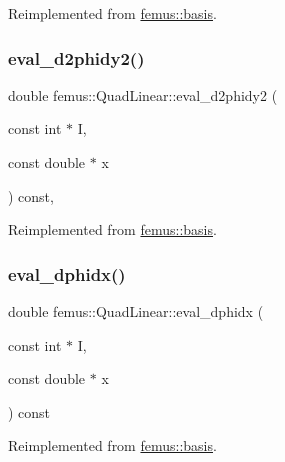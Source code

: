 Reimplemented from \mbox{\hyperlink{classfemus_1_1basis_ac9feaf9e60421143db2a3708f3c7fa48}{femus\+::basis}}.

\mbox{\label{classfemus_1_1_quad_linear_acd036b93e46b4c610a08a71d0ed06745}} 
\subsubsection{\texorpdfstring{eval\+\_\+d2phidy2()}{eval\_d2phidy2()}}
{\footnotesize\ttfamily double femus\+::\+Quad\+Linear\+::eval\+\_\+d2phidy2 (\begin{DoxyParamCaption}\item[{const int $\ast$}]{I,  }\item[{const double $\ast$}]{x }\end{DoxyParamCaption}) const\hspace{0.3cm}{\ttfamily [inline]}, {\ttfamily [virtual]}}



Reimplemented from \mbox{\hyperlink{classfemus_1_1basis_a0febb29fe4b32213ff8d6d428f7241cd}{femus\+::basis}}.

\mbox{\label{classfemus_1_1_quad_linear_a8f5b2825197015a09664548848ceb0bf}} 
\subsubsection{\texorpdfstring{eval\+\_\+dphidx()}{eval\_dphidx()}}
{\footnotesize\ttfamily double femus\+::\+Quad\+Linear\+::eval\+\_\+dphidx (\begin{DoxyParamCaption}\item[{const int $\ast$}]{I,  }\item[{const double $\ast$}]{x }\end{DoxyParamCaption}) const\hspace{0.3cm}{\ttfamily [virtual]}}



Reimplemented from \mbox{\hyperlink{classfemus_1_1basis_a4db7d29cf8a753ddbccc4a297dafa0bf}{femus\+::basis}}.

